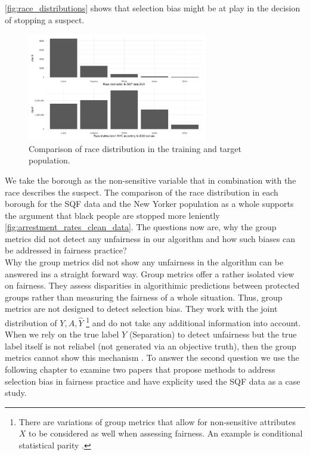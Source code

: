 \autoref{fig:race_distributions} shows that selection bias might be at play in the decision of stopping a suspect.
\begin{figure}
    \centering
    \includegraphics[width=0.7\textwidth]{../figures/sqf_case_study_plot6.png}
    \caption{Comparison of race distribution in the training and target population.}
    \label{fig:race_distributions}
\end{figure}

We take the borough as the non-sensitive variable that in combination with the race describes the suspect.  The comparison of the race distribution in each borough for the SQF data and the New Yorker population as a whole supports the argument that black people are stopped more leniently \autoref{fig:arrestment_rates_clean_data}. The questions now are, why the group metrics did not detect any unfairness in our algorithm and how such biases can be addressed in fairness practice? \\
Why the group metrics did not show any unfairness in the algorithm can be answered ins a straight forward way. Group metrics offer a rather isolated view on fairness. They assess disparities in algorithimic predictions between protected groups rather than measuring the fairness of a whole situation. Thus, group metrics are not designed to detect selection bias. They work with the joint distribution of $Y, A, \hat{Y}$ \footnote{There are variations of group metrics that allow for non-sensitive attributes $X$ to be considered as well when assessing fairness. An example is conditional statistical parity \cite{verma2018}.} 
and do not take any additional information into account. When we rely on the true label $Y$ (Separation) to detect unfairness but the true label itself is not reliabel (not generated via an objective truth), then the group metrics cannot show this mechanism \cite{castelnovo2022}.
To answer the second question we use the following chapter to examine two papers that propose methods to address selection bias in fairness practice and have explicity used the SQF data as a case study.


